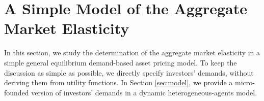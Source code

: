 




\section{A Simple Model of the Aggregate Market Elasticity}\label{sec:simple}

In this section, we study the determination of the aggregate market elasticity in a simple general equilibrium demand-based asset pricing model. 
To keep the discussion as simple as possible, we directly specify investors' demands, without deriving them from utility functions. 
In Section \ref{sec:model}, we provide a micro-founded version of investors' demands in a dynamic heterogeneous-agents model.

